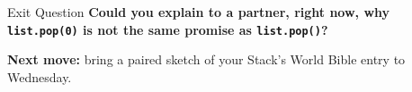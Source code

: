 \documentclass[aspectratio=169]{beamer}
\begin{document}
\begin{exitframe}{Exit Question}
  \Large\color{cs2primary}
  \textbf{Could you explain to a partner, right now, why \texttt{list.pop(0)} is not the same promise as \texttt{list.pop()}?}

  \vspace{4mm}
  \normalsize\normalfont\color{cs2ink}
  \textbf{Next move:} bring a paired sketch of your Stack's World Bible
  entry to Wednesday.
\end{exitframe}
\end{document}

